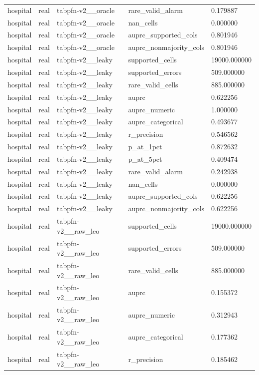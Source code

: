 \begin{tabular}{lllll}
hospital & real & tabpfn-v2\_\_oracle & rare\_valid\_alarm & 0.179887 \\
hospital & real & tabpfn-v2\_\_oracle & nan\_cells & 0.000000 \\
hospital & real & tabpfn-v2\_\_oracle & auprc\_supported\_cols & 0.801946 \\
hospital & real & tabpfn-v2\_\_oracle & auprc\_nonmajority\_cols & 0.801946 \\
hospital & real & tabpfn-v2\_\_leaky & supported\_cells & 19000.000000 \\
hospital & real & tabpfn-v2\_\_leaky & supported\_errors & 509.000000 \\
hospital & real & tabpfn-v2\_\_leaky & rare\_valid\_cells & 885.000000 \\
hospital & real & tabpfn-v2\_\_leaky & auprc & 0.622256 \\
hospital & real & tabpfn-v2\_\_leaky & auprc\_numeric & 1.000000 \\
hospital & real & tabpfn-v2\_\_leaky & auprc\_categorical & 0.493677 \\
hospital & real & tabpfn-v2\_\_leaky & r\_precision & 0.546562 \\
hospital & real & tabpfn-v2\_\_leaky & p\_at\_1pct & 0.872632 \\
hospital & real & tabpfn-v2\_\_leaky & p\_at\_5pct & 0.409474 \\
hospital & real & tabpfn-v2\_\_leaky & rare\_valid\_alarm & 0.242938 \\
hospital & real & tabpfn-v2\_\_leaky & nan\_cells & 0.000000 \\
hospital & real & tabpfn-v2\_\_leaky & auprc\_supported\_cols & 0.622256 \\
hospital & real & tabpfn-v2\_\_leaky & auprc\_nonmajority\_cols & 0.622256 \\
hospital & real & tabpfn-v2\_\_raw\_leo & supported\_cells & 19000.000000 \\
hospital & real & tabpfn-v2\_\_raw\_leo & supported\_errors & 509.000000 \\
hospital & real & tabpfn-v2\_\_raw\_leo & rare\_valid\_cells & 885.000000 \\
hospital & real & tabpfn-v2\_\_raw\_leo & auprc & 0.155372 \\
hospital & real & tabpfn-v2\_\_raw\_leo & auprc\_numeric & 0.312943 \\
hospital & real & tabpfn-v2\_\_raw\_leo & auprc\_categorical & 0.177362 \\
hospital & real & tabpfn-v2\_\_raw\_leo & r\_precision & 0.185462 \\

\end{tabular}
